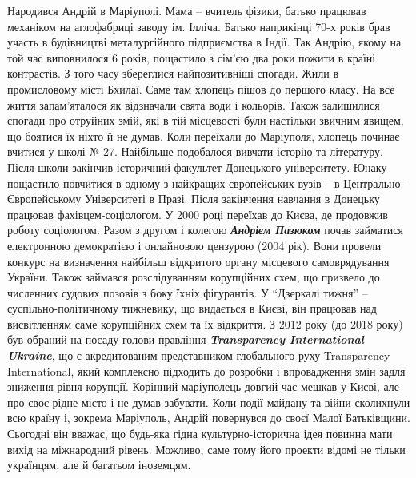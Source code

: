 Народився Андрій в Маріуполі. Мама – вчитель фізики, батько працював механіком
на аглофабриці заводу ім. Ілліча. Батько наприкінці 70-х років брав участь в
будівництві металургійного підприємства в Індії. Так Андрію, якому на той час
виповнилося 6 років, пощастило з сім'єю два роки пожити в країні контрастів. З
того часу збереглися найпозитивніші спогади. Жили в промисловому місті Бхилаї.
Саме там хлопець пішов до першого класу. На все життя запам'яталося як
відзначали свята води і кольорів. Також залишилися спогади про отруйних змій,
які в тій місцевості були настільки звичним явищем, що боятися їх ніхто й не
думав. Коли переїхали до Маріуполя, хлопець починає вчитися у школі № 27.
Найбільше подобалося вивчати історію та літературу. Після школи закінчив
історичний факультет Донецького університету. Юнаку пощастило повчитися в
одному з найкращих європейських вузів – в Центрально-Європейському Університеті
в Празі. Після закінчення навчання в Донецьку працював фахівцем-соціологом. У
2000 році переїхав до Києва, де продовжив роботу соціологом. Разом з другом і
колегою \emph{\textbf{Андрієм Пазюком}} почав займатися електронною демократією і онлайновою
цензурою (2004 рік). Вони провели конкурс на визначення найбільш відкритого
органу місцевого самоврядування України. Також займався розслідуванням
корупційних схем, що призвело до численних судових позовів з боку їхніх
фігурантів. У \enquote{Дзеркалі тижня} – суспільно-політичному тижневику, що видається
в Києві, він працював над висвітленням саме корупційних схем та їх відкриття. З
2012 року (до 2018 року) був обраний на посаду голови  правління \emph{\textbf{Transparency
International Ukraine}}, що є акредитованим представником глобального руху
Transparency International, який комплексно підходить до розробки і
впровадження змін задля зниження рівня корупції. Корінний маріуполець довгий
час мешкав у Києві, але про своє рідне місто і не думав забувати.  Коли події
майдану та війни сколихнули всю країну і, зокрема Маріуполь, Андрій повернувся
до своєї Малої Батьківщини. Сьогодні він вважає, що будь-яка гідна
культурно-історична ідея повинна мати вихід на міжнародний рівень. Можливо,
саме тому його проекти відомі не тільки українцям, але й багатьом іноземцям. 

